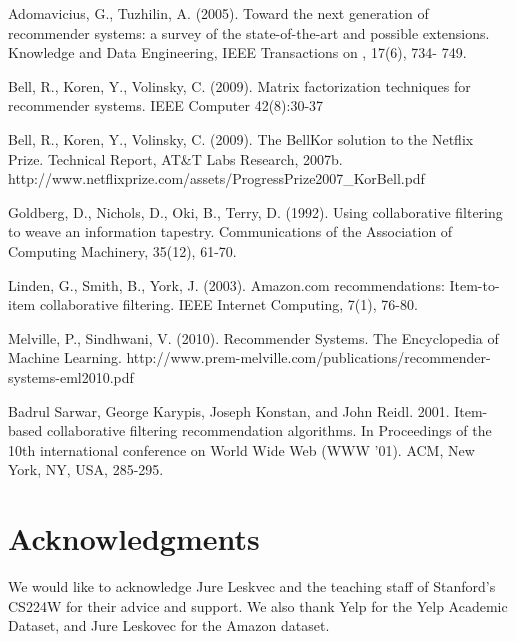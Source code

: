\documentclass[letterpaper, 11 pt, conference]{ieeeconf}
\begin{document}
\begin{thebibliography}{99}

Adomavicius, G., Tuzhilin, A. (2005). Toward the next generation of recommender systems: a survey of the state-of-the-art and possible extensions. Knowledge and Data Engineering, IEEE Transactions on , 17(6),  734- 749.

Bell, R., Koren, Y., Volinsky, C. (2009). Matrix factorization techniques for recommender systems. IEEE Computer 42(8):30-37

Bell, R., Koren, Y., Volinsky, C. (2009). 
The BellKor solution to the Netﬂix Prize. Technical Report, AT\&T Labs 
Research, 2007b. 
http://www.netflixprize.com/assets/ProgressPrize2007\_KorBell.pdf


Goldberg, D., Nichols, D., Oki, B., Terry, D. (1992). 
Using collaborative filtering to weave an information tapestry. 
Communications of the Association of Computing Machinery, 35(12), 61-70.

Linden, G., Smith, B., York, J. (2003). Amazon.com recommendations: Item-to-item collaborative filtering. IEEE Internet
Computing, 7(1), 76-80.

Melville, P., Sindhwani, V. (2010).
Recommender Systems. The Encyclopedia of Machine Learning. 
http://www.prem-melville.com/publications/recommender-systems-eml2010.pdf

Badrul Sarwar, George Karypis, Joseph Konstan, and John Reidl. 2001.
Item-based collaborative filtering recommendation algorithms.
In Proceedings of the 10th international conference on World Wide Web (WWW '01). ACM, New York, NY, USA, 285-295. 

\end{thebibliography}

\section{Acknowledgments}
We would like to acknowledge Jure Leskvec and the teaching staff of 
Stanford's CS224W for their advice and support. We also thank Yelp for the 
Yelp Academic Dataset, and Jure Leskovec for the Amazon dataset.
\end{document}
